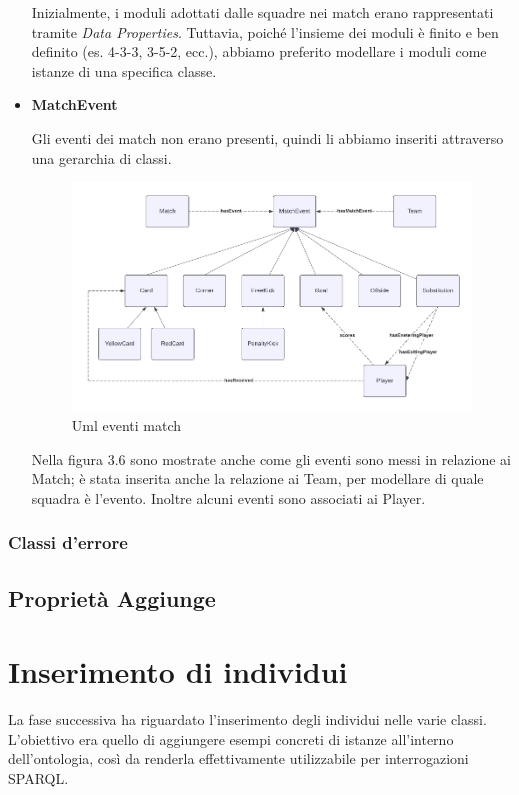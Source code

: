 \documentclass[11pt]{report} %
\begin{document}
\begin{itemize}[leftmargin=*]
  Inizialmente, i moduli adottati dalle squadre nei match erano rappresentati tramite \textit{Data Properties}. Tuttavia, poiché l’insieme dei moduli è finito e ben definito (es. 4-3-3, 3-5-2, ecc.), abbiamo preferito modellare i moduli come istanze di una specifica classe.

  \item \textbf{MatchEvent}

  Gli eventi dei match non erano presenti, quindi li abbiamo inseriti attraverso una gerarchia di classi.

\begin{figure} [h]
    \centering
    \includegraphics[width=\textwidth]{MATCHEVENT.png}
    \caption{Uml eventi match}
\end{figure}

Nella figura 3.6 sono mostrate anche come gli eventi sono messi in relazione ai Match; è stata inserita anche la relazione ai Team, per modellare di quale squadra è l'evento. Inoltre alcuni eventi sono associati ai Player. 

\end{itemize}

\newpage
 \subsection{Classi d'errore}

 \newpage
 \section{Proprietà Aggiunge}

\chapter{Inserimento di individui}
La fase successiva ha riguardato l'inserimento degli individui nelle varie classi. L'obiettivo era quello di aggiungere esempi concreti di istanze all'interno dell'ontologia, così da renderla effettivamente utilizzabile per interrogazioni SPARQL.
\end{document}
